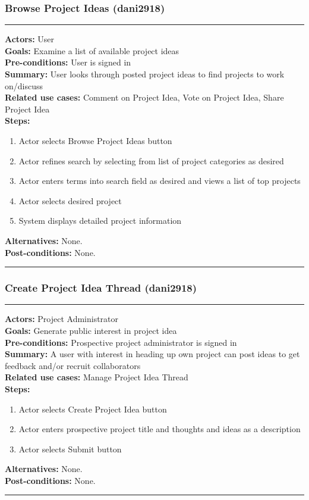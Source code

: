 \documentclass[11pt]{report}
\begin{document}
\subsubsection{Browse Project Ideas (dani2918)}
\vspace{2pt}
\hrule
\vspace{8pt}
 \textbf{Actors:} User \\ 
 \textbf{Goals:} Examine a list of available project ideas  \\
 \textbf{Pre-conditions:} User is signed in  \\
 \textbf{Summary:} User looks through posted project ideas to find projects to work on/discuss \\ 
 \textbf{Related use cases:} Comment on Project Idea, Vote on Project Idea, Share Project Idea \\ 
 \textbf{Steps:} \begin{enumerate}
  \item Actor selects Browse Project Ideas button
  \item Actor refines search by selecting from list of project categories as desired
  \item Actor enters terms into search field as desired and views a list of top projects
  \item Actor selects desired project
  \item System displays detailed project information
 \end{enumerate}
 \textbf{Alternatives:} None. \\
 \textbf{Post-conditions:} None. \\
 \vspace{8pt}
\hrule
\newpage
\subsubsection{Create Project Idea Thread (dani2918)}
\vspace{2pt}
\hrule
\vspace{8pt}
 \textbf{Actors:} Project Administrator \\ 
 \textbf{Goals:} Generate public interest in project idea  \\
 \textbf{Pre-conditions:} Prospective project administrator is signed in  \\
 \textbf{Summary:}  A user with interest in heading up own project can post ideas to get feedback and/or recruit collaborators \\ 
 \textbf{Related use cases:} Manage Project Idea Thread \\ 
 \textbf{Steps:} \begin{enumerate}
  \item Actor selects Create Project Idea button
  \item Actor enters prospective project title and thoughts and ideas as a description
  \item Actor selects Submit button

 \end{enumerate}
 \textbf{Alternatives:} None. \\
 \textbf{Post-conditions:} None. \\
 \vspace{8pt}
\hrule
\newpage
\end{document}
